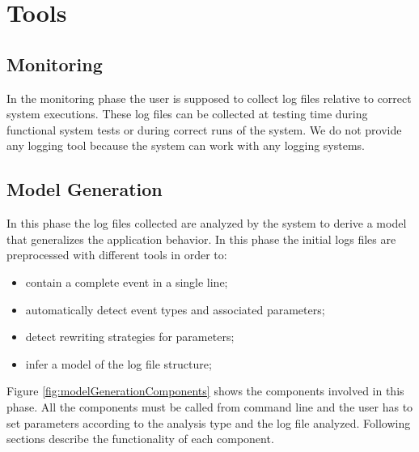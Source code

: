 \chapter{Tools}

\section{Monitoring}

In the monitoring phase the user is supposed to collect log files
relative to correct system executions. These log files can be
collected at testing time during functional system tests or during
correct runs of the system. We do not provide any logging tool
because the system can work with any logging systems.

\section{Model Generation}

In this phase the log files collected are analyzed by the system to
derive a model that generalizes the application behavior.
In this phase the initial logs files are preprocessed with different
tools in order to:
\begin{itemize}
 \item contain a complete event in a single line;
\item automatically detect event types and associated parameters;
\item detect rewriting strategies for parameters;
\item infer a model of the log file structure;
\end{itemize}

Figure \ref{fig:modelGenerationComponents} shows the components
involved
in this phase. All the components must be called from command line
and the user has to set parameters according to the analysis type and
the log file analyzed. Following sections describe the functionality
of each component. 

